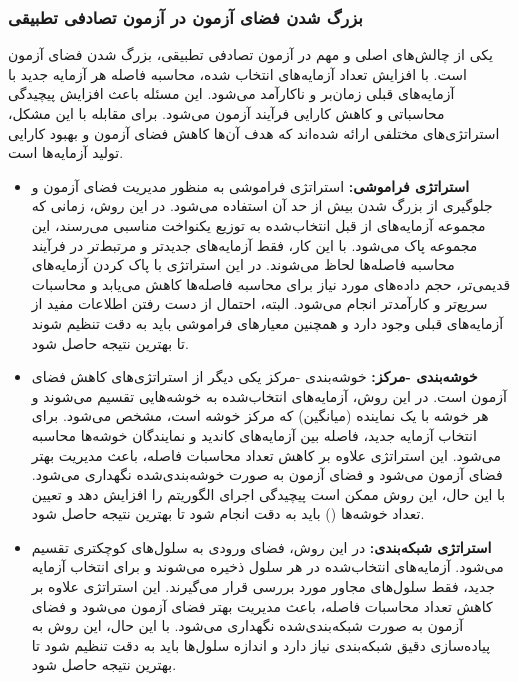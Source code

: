 \subsubsection{بزرگ شدن فضای آزمون در آزمون تصادفی تطبیقی}
یکی از چالش‌های اصلی و مهم در آزمون تصادفی تطبیقی، بزرگ شدن فضای آزمون است. با افزایش تعداد آزمایه‌های انتخاب شده، محاسبه فاصله هر آزمایه جدید با آزمایه‌های قبلی زمان‌بر و ناکارآمد می‌شود. این مسئله باعث افزایش پیچیدگی محاسباتی و کاهش کارایی فرآیند آزمون می‌شود. برای مقابله با این مشکل، استراتژی‌های مختلفی ارائه شده‌اند که هدف آن‌ها کاهش فضای آزمون و بهبود کارایی تولید آزمایه‌ها است.
\begin{itemize}
	\item \textbf{استراتژی فراموشی:} استراتژی فراموشی به منظور مدیریت فضای آزمون و جلوگیری از بزرگ شدن بیش از حد آن استفاده می‌شود. در این روش، زمانی که مجموعه آزمایه‌های از قبل انتخاب‌شده به توزیع یکنواخت مناسبی می‌رسند، این مجموعه پاک می‌شود. با این کار، فقط آزمایه‌های جدیدتر و مرتبط‌تر در فرآیند محاسبه فاصله‌ها لحاظ می‌شوند. در این استراتژی با پاک کردن آزمایه‌های قدیمی‌تر، حجم داده‌های مورد نیاز برای محاسبه فاصله‌ها کاهش می‌یابد و محاسبات سریع‌تر و کارآمدتر انجام می‌شود. البته، احتمال از دست رفتن اطلاعات مفید از آزمایه‌های قبلی وجود دارد و همچنین معیارهای فراموشی باید به دقت تنظیم شوند تا بهترین نتیجه حاصل شود.
	
	\item \textbf{خوشه‌بندی -مرکز:} خوشه‌بندی -مرکز یکی دیگر از استراتژی‌های کاهش فضای آزمون است. در این روش، آزمایه‌های انتخاب‌شده به خوشه‌هایی تقسیم می‌شوند و هر خوشه با یک نماینده (میانگین) که مرکز خوشه است، مشخص می‌شود. برای انتخاب آزمایه جدید، فاصله بین آزمایه‌های کاندید و نمایندگان خوشه‌ها محاسبه می‌شود. این استراتژی علاوه بر کاهش تعداد محاسبات فاصله، باعث مدیریت بهتر فضای آزمون می‌شود و فضای آزمون به صورت خوشه‌بندی‌شده نگهداری می‌شود. با این حال، این روش ممکن است پیچیدگی اجرای الگوریتم را افزایش دهد و تعیین تعداد خوشه‌ها () باید به دقت انجام شود تا بهترین نتیجه حاصل شود.
	
	\item \textbf{استراتژی شبکه‌بندی:} در این روش، فضای ورودی به سلول‌های کوچکتری تقسیم می‌شود. آزمایه‌های انتخاب‌شده در هر سلول ذخیره می‌شوند و برای انتخاب آزمایه جدید، فقط سلول‌های مجاور مورد بررسی قرار می‌گیرند. این استراتژی علاوه بر کاهش تعداد محاسبات فاصله، باعث مدیریت بهتر فضای آزمون می‌شود و فضای آزمون به صورت شبکه‌بندی‌شده نگهداری می‌شود. با این حال، این روش به پیاده‌سازی دقیق شبکه‌بندی نیاز دارد و اندازه سلول‌ها باید به دقت تنظیم شود تا بهترین نتیجه حاصل شود.

\end{itemize}

